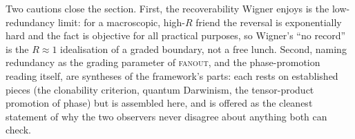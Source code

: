 Two cautions close the section. First, the recoverability Wigner
enjoys is the low-redundancy limit: for a macroscopic, high-$R$ friend the
reversal is exponentially hard and the fact is objective for all practical
purposes, so Wigner's ``no record'' is the $R\!\approx\!1$ idealisation of a
graded boundary, not a free lunch. Second, naming redundancy as the grading
parameter of \textsc{fanout}, and the phase-promotion reading itself, are
syntheses of the framework's parts: each rests on established pieces (the
clonability criterion, quantum Darwinism, the tensor-product promotion of phase)
but is assembled here, and is offered as the cleanest statement of why the two
observers never disagree about anything both can check.
%
%
